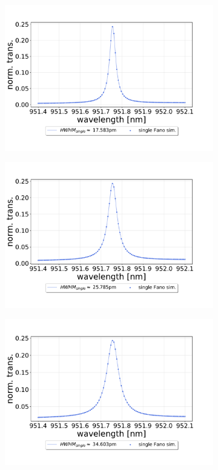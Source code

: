 \begin{figure}[h!]
\begin{subfigure}[b]{0.49\textwidth}
        \includegraphics[width=\textwidth]{figures/results/single fano fits/120um_M5_simfit.pdf}
        \caption{}
        \label{fig:120um_M5_sim}
    \end{subfigure}
    \begin{subfigure}[b]{0.49\textwidth}
        \includegraphics[width=\textwidth]{figures/results/single fano fits/60um_M5_simfit.pdf}
        \caption{}
        \label{fig:60um_M5_sim}
    \end{subfigure}
    \begin{subfigure}[b]{0.49\textwidth}
        \includegraphics[width=\textwidth]{figures/results/single fano fits/5um_M5_simfit.pdf}

\end{subfigure}
\end{figure}

